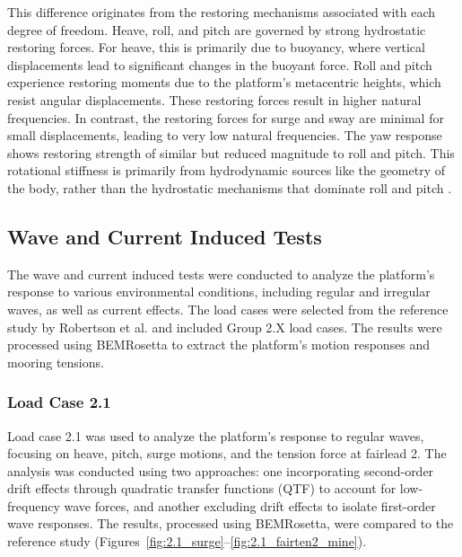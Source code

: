 \documentclass[a4paper, 11pt]{article}
\begin{document}
This difference originates from the restoring mechanisms associated with each degree of freedom. Heave, roll, and pitch are governed by strong hydrostatic restoring forces. For heave, this is primarily due to buoyancy, where vertical displacements lead to significant changes in the buoyant force. Roll and pitch experience restoring moments due to the platform's metacentric heights, which resist angular displacements. These restoring forces result in higher natural frequencies. In contrast, the restoring forces for surge and sway are minimal for small displacements, leading to very low natural frequencies. The yaw response shows restoring strength of similar but reduced magnitude to roll and pitch. This rotational stiffness is primarily from hydrodynamic sources like the geometry of the body, rather than the hydrostatic mechanisms that dominate roll and pitch \cite{metacenter}.


\subsection{Wave and Current Induced Tests}
\hspace*{0.5cm}The wave and current induced tests were conducted to analyze the platform's response to various environmental conditions, including regular and irregular waves, as well as current effects. The load cases were selected from the reference study by Robertson et al. \cite{Robertson2014} and included Group 2.X load cases. The results were processed using BEMRosetta to extract the platform's motion responses and mooring tensions.

\subsubsection{Load Case 2.1}

\hspace{0.5cm}Load case 2.1 was used to analyze the platform’s response to regular waves, focusing on heave, pitch, surge motions, and the tension force at fairlead 2. The analysis was conducted using two approaches: one incorporating second-order drift effects through quadratic transfer functions (QTF) to account for low-frequency wave forces, and another excluding drift effects to isolate first-order wave responses. The results, processed using BEMRosetta, were compared to the reference study (Figures~\ref{fig:2.1_surge}--\ref{fig:2.1_fairten2_mine}).
\end{document}
